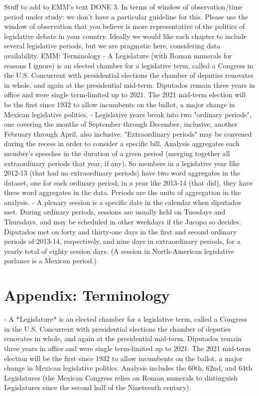\documentclass[letter,12pt]{article}
\begin{document}
Stuff to add to EMM’s text
DONE 3. In terms of window of observation/time period under study: we don’t have a particular guideline for this. Please use the window of observation that you believe is more representative of the politics of legislative debate in your country. Ideally we would like each chapter to include several legislative periods, but we are pragmatic here, considering data availability.
EMM: Terminology
- A Legislature (with Roman numerals for reasons I ignore) is an elected chamber for a legislative term, called a Congress in the U.S. Concurrent with presidential elections the chamber of deputies renovates in whole, and again at the presidential mid-term. Diputados remain three years in office and were single term-limited up to 2021. The 2021 mid-term election will be the first since 1932 to allow incumbents on the ballot, a major change in Mexican legislative politics.
- Legislative years break into two "ordinary periods", one covering the months of September through December, inclusive, another February through April, also inclusive. "Extraordinary periods" may be convened during the recess in order to consider a specific bill. Analysis aggregates each member's speeches in the duration of a given period (merging together all extraordinary periods that year, if any). So members in a legislative year like 2012-13 (that had no extraordinary periods) have two word aggregates in the dataset, one for each ordinary period; in a year like 2013-14 (that did), they have three word aggregates in the data. Periods are the units of aggregation in the analysis. 
- A plenary session is a specific date in the calendar when diputados met. During ordinary periods, sessions are usually held on Tuesdays and Thursdays, and may be scheduled in other weekdays if the Jucopo so decides. Diputados met on forty and thirty-one days in the first and second ordinary periods of 2013-14, respectively, and nine days in extraordinary periods, for a yearly total of eighty session days. (A session in North-American legislative parlance is a Mexican period.)

\section{Appendix: Terminology}

\singlespacing

- A *Legislature* is an elected chamber for a legislative term, called a Congress in the U.S. Concurrent with presidential elections the chamber of deputies renovates in whole, and again at the presidential mid-term. Diputados remain three years in office and were single term-limited up to 2021. The 2021 mid-term election will be the first since 1932 to allow incumbents on the ballot, a major change in Mexican legislative politics. Analysis includes the 60th, 62nd, and 64th Legislatures (the Mexican Congress relies on Roman numerals to distinguish Legislatures since the second half of the Nineteenth century).
\end{document}
